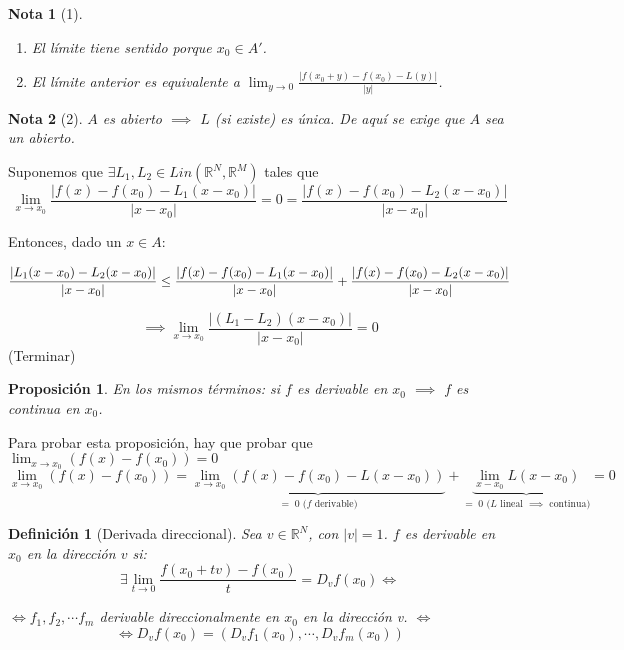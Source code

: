 \documentclass[11pt, a4paper, titlepage]{article}
\makeatletter
\renewenvironment{proof}[1][\proofname] {\vspace{-15pt}\par\pushQED{\qed}\normalfont\topsep6\p@\@plus6\p@\relax\trivlist\item[\hskip\labelsep\it#1\@addpunct{.}]\ignorespaces}{\popQED\endtrivlist\@endpefalse}
\theoremstyle{theorem-style}
\newtheorem*{nprop}{Proposición}
\theoremstyle{definition-style}
\newtheorem*{ndef}{Definición}
\theoremstyle{remark-style}
\newtheorem*{nota}{Nota}
\theoremstyle{example-style}
\newenvironment{nlist}
{\begin{enumerate}
\renewcommand\labelenumi{(\emph{\roman{enumi})}}}
{\end{enumerate}}
\makeatother
\begin{document}
\begin{nota}[1]\hfill
	\begin{nlist}
		\item El límite tiene sentido porque $x_0\in A'$.
		\item El límite anterior es equivalente a $\lim_{y\to 0} \frac{|f(x_0+y)-f(x_0)-L(y)|}{|y|}$.
	\end{nlist}
\end{nota}

\begin{nota}[2]
	$A$ es abierto $\implies$ $L$ (si existe) es única. De aquí se exige que $A$ sea un abierto. 
\end{nota}

\begin{proof}[Demostración (Nota 2)]
	Suponemos que $\exists L_1,L_2\in Lin(\mathbb{R}^N, \mathbb{R}^M)$ tales que 
\[
\lim_{x\to x_0} \frac{|f(x)-f(x_0)- L_1(x-x_0)|}{|x-x_0|} =0= \frac{|f(x)-f(x_0)- L_2(x-x_0)|}{|x-x_0|}
\]

Entonces, dado un $x\in A$:

\begin{align}
	\frac{|L_1(x-x_0) - L_2(x-x_0)|}{|x-x_0|} \le \frac{|f(x)-f(x_0)- L_1(x-x_0)|}{|x-x_0|} + \frac{|f(x)-f(x_0)- L_2(x-x_0)|}{|x-x_0|}\notag
\end{align}

\[
\implies \lim_{x\to x_0} \frac{|(L_1-L_2)(x-x_0)|}{|x-x_0|} = 0
\]
(Terminar)
\end{proof}

\begin{nprop} En los mismos términos: si $f$ es derivable en $x_0$ $\implies$ $f$ es continua en $x_0$.
	
\end{nprop}

\begin{proof} Para probar esta proposición, hay que probar que $\lim_{x\to x_0} (f(x)-f(x_0)) = 0$
\[
	\lim_{x\to x_0} (f(x)-f(x_0)) = \underbrace{\lim_{x\to x_0} (f(x)-f(x_0)-L(x-x_0))}_{=\;0 \text{ ($f$ derivable)}} + \underbrace{\lim_{x-x_0} L(x-x_0)}_{=\; 0 \text{ ($L$ lineal $\implies$ continua)}} = 0
\]
\end{proof}

\begin{ndef}[Derivada direccional]
	Sea $v\in \mathbb{R}^N$, con $|v| = 1$. $f$ es derivable en $x_0$ en la dirección $v$ si:
	\[
		\exists \lim_{t\to 0} \frac{f(x_0+tv)-f(x_0)}{t} = D_v f(x_0) \iff
	\]
	
	\begin{center}
	$\iff f_1,f_2,\cdots f_m$ derivable direccionalmente en $x_0$ en la dirección v. $\iff$
	\[
	\iff D_vf(x_0) = (D_vf_1(x_0),\cdots,D_vf_m(x_0))
	\]
\end{center}
\end{ndef}
\end{document}
